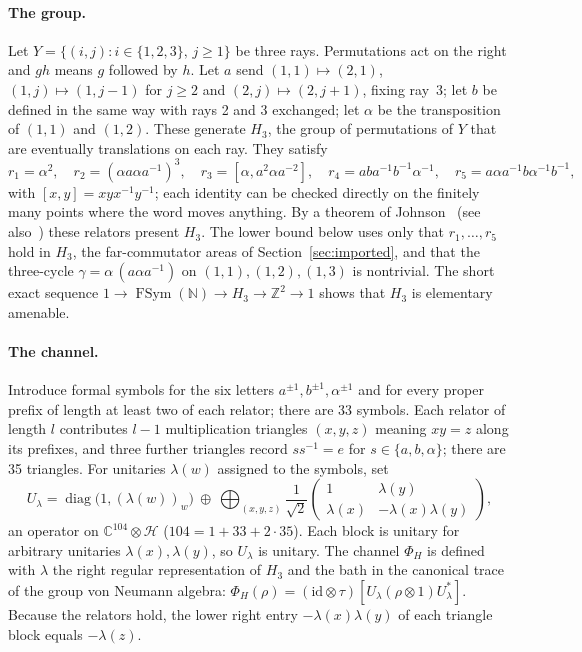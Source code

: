 \documentclass[11pt,a4paper]{article}
\theoremstyle{plain}
\theoremstyle{definition}
\theoremstyle{remark}
\DeclareMathOperator{\diag}{diag}
\DeclareMathOperator{\FSym}{FSym}
\begin{document}
\paragraph{The group.} Let $Y=\{(i,j):i\in\{1,2,3\},\,j\ge1\}$ be three rays. Permutations act on the right and
$gh$ means $g$ followed by $h$. Let $a$ send $(1,1)\mapsto(2,1)$, $(1,j)\mapsto(1,j-1)$ for $j\ge2$ and
$(2,j)\mapsto(2,j+1)$, fixing ray~3; let $b$ be defined in the same way with rays 2 and 3 exchanged; let $\alpha$ be
the transposition of $(1,1)$ and $(1,2)$. These generate $H_3$, the group of permutations of $Y$ that are eventually
translations on each ray. They satisfy
\begin{equation}\label{eq:relators}
r_1=\alpha^2,\quad r_2=(\alpha a\alpha a^{-1})^3,\quad r_3=[\alpha,a^2\alpha a^{-2}],\quad
r_4=aba^{-1}b^{-1}\alpha^{-1},\quad r_5=a\alpha a^{-1}b\alpha^{-1}b^{-1},
\end{equation}
with $[x,y]=xyx^{-1}y^{-1}$; each identity can be checked directly on the finitely many points where the word
moves anything. By a theorem of Johnson~\cite{Johnson1999} (see also~\cite[Theorem~2.8]{Lee2012}) these relators present $H_3$. The lower
bound below uses only that $r_1,\dots,r_5$ hold in $H_3$, the far-commutator areas of Section~\ref{sec:imported}, and
that the three-cycle $\gamma=\alpha\,(a\alpha a^{-1})$ on $(1,1),(1,2),(1,3)$ is nontrivial. The short exact sequence
$1\to\FSym(\mathbb{N})\to H_3\to\mathbb{Z}^2\to1$ shows that $H_3$ is elementary amenable.

\paragraph{The channel.} Introduce formal symbols for the six letters $a^{\pm1},b^{\pm1},\alpha^{\pm1}$ and for every
proper prefix of length at least two of each relator; there are 33 symbols. Each relator of length $l$ contributes
$l-1$ multiplication triangles $(x,y,z)$ meaning $xy=z$ along its prefixes, and three further triangles record
$ss^{-1}=e$ for $s\in\{a,b,\alpha\}$; there are 35 triangles. For unitaries $\lambda(w)$ assigned to the symbols,
set
\[
U_\lambda=\diag\big(1,(\lambda(w))_{w}\big)\ \oplus\ \bigoplus_{(x,y,z)}\frac{1}{\sqrt2}
\begin{pmatrix}1&\lambda(y)\\ \lambda(x)&-\lambda(x)\lambda(y)\end{pmatrix},
\]
an operator on $\mathbb{C}^{104}\otimes\mathcal{H}$ ($104=1+33+2\cdot35$). Each block is unitary for arbitrary
unitaries $\lambda(x),\lambda(y)$, so $U_\lambda$ is unitary. The channel $\Phi_H$ is defined with $\lambda$ the right
regular representation of $H_3$ and the bath in the canonical trace of the group von Neumann algebra:
$\Phi_H(\rho)=(\mathrm{id}\otimes\tau)[U_\lambda(\rho\otimes1)U_\lambda^*]$. Because the relators hold, the lower right
entry $-\lambda(x)\lambda(y)$ of each triangle block equals $-\lambda(z)$.
\end{document}
